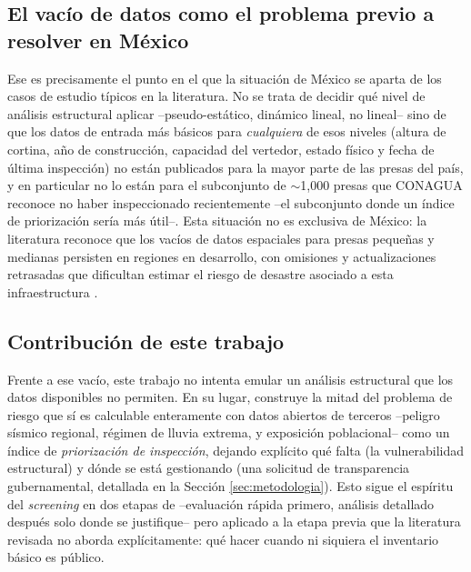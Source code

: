 \subsection{El vac\'io de datos como el problema previo a resolver en M\'exico}

Ese es precisamente el punto en el que la situaci\'on de M\'exico se aparta de los casos de estudio t\'ipicos en la literatura. No se trata de decidir qu\'e nivel de an\'alisis estructural aplicar --pseudo-est\'atico, din\'amico lineal, no lineal-- sino de que los datos de entrada m\'as b\'asicos para \emph{cualquiera} de esos niveles (altura de cortina, a\~no de construcci\'on, capacidad del vertedor, estado f\'isico y fecha de \'ultima inspecci\'on) no est\'an publicados para la mayor parte de las presas del pa\'is, y en particular no lo est\'an para el subconjunto de \(\sim\)1{,}000 presas que CONAGUA reconoce no haber inspeccionado recientemente \cite{infobae2020presas} --el subconjunto donde un \'indice de priorizaci\'on ser\'ia m\'as \'util--. Esta situaci\'on no es exclusiva de M\'exico: la literatura reconoce que los vac\'ios de datos espaciales para presas peque\~nas y medianas persisten en regiones en desarrollo, con omisiones y actualizaciones retrasadas que dificultan estimar el riesgo de desastre asociado a esta infraestructura \cite{natural2023multiscale}.

\subsection{Contribuci\'on de este trabajo}

Frente a ese vac\'io, este trabajo no intenta emular un an\'alisis estructural que los datos disponibles no permiten. En su lugar, construye la mitad del problema de riesgo que s\'i es calculable enteramente con datos abiertos de terceros --peligro s\'ismico regional, r\'egimen de lluvia extrema, y exposici\'on poblacional-- como un \'indice de \emph{priorizaci\'on de inspecci\'on}, dejando expl\'icito qu\'e falta (la vulnerabilidad estructural) y d\'onde se est\'a gestionando (una solicitud de transparencia gubernamental, detallada en la Secci\'on \ref{sec:metodologia}). Esto sigue el esp\'iritu del \emph{screening} en dos etapas de \cite{natural2023multiscale} --evaluaci\'on r\'apida primero, an\'alisis detallado despu\'es solo donde se justifique-- pero aplicado a la etapa previa que la literatura revisada no aborda expl\'icitamente: qu\'e hacer cuando ni siquiera el inventario b\'asico es p\'ublico.

